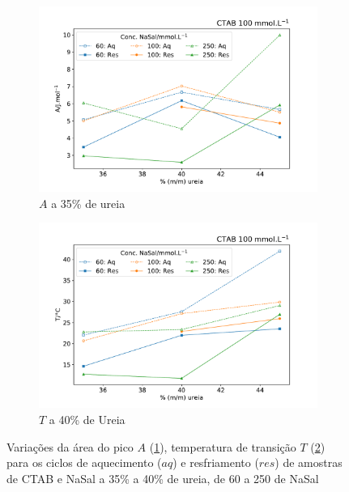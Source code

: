 		\begin{figure}[H]
		\centering
		\begin{subfigure}[t]{0.45\textwidth}
			\includegraphics[width=\textwidth]{./imagens/dsc/A_NaSal_c_UR_aq_res}
			\caption{$A$ a 35\% de ureia}
			\label{fig:DSC_A_NaSal}
		\end{subfigure} \qquad %
		\begin{subfigure}[t]{0.45\textwidth}
			\includegraphics[width=\textwidth]{./imagens/dsc/T_NaSal_c_UR_aq_res}
			\caption{$T$ a 40\% de Ureia}
			\label{fig:DSC_T_NaSal}
		\end{subfigure}
		
		\caption{Variações da área do pico $A$ (\ref{fig:DSC_A_NaSal}), temperatura de transição $T$ (\ref{fig:DSC_T_NaSal}) para os ciclos de aquecimento ($aq$) e resfriamento ($res$) de amostras de CTAB e NaSal a 35\% a 40\% de ureia, de 60 a 250 \mM{} de NaSal}
		\label{fig:DSC_propriedades_NaSal}
	\end{figure}
		
